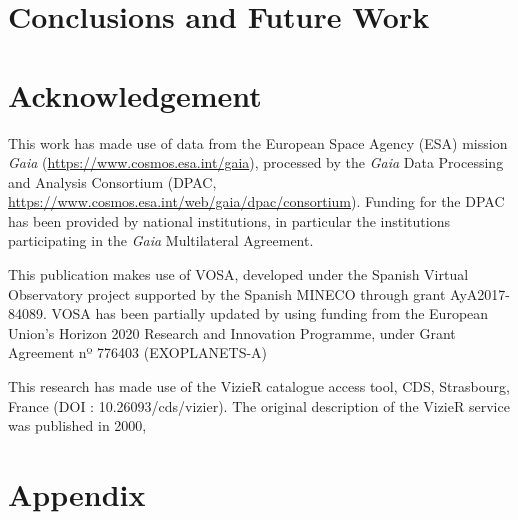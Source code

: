 \documentclass[11pt, a4paper, english]{book}
\begin{document}
\chapter{Conclusions and Future Work}

\chapter*{Acknowledgement}

This work has made use of data from the European Space Agency (ESA) mission
{\it Gaia} (\url{https://www.cosmos.esa.int/gaia}), processed by the {\it Gaia}
Data Processing and Analysis Consortium (DPAC,
\url{https://www.cosmos.esa.int/web/gaia/dpac/consortium}). Funding for the DPAC
has been provided by national institutions, in particular the institutions
participating in the {\it Gaia} Multilateral Agreement.

\medskip

This publication makes use of VOSA, developed under the Spanish Virtual Observatory project
supported by the Spanish MINECO through grant AyA2017-84089.
VOSA has been partially updated by using funding from the European Union's Horizon 2020 Research
and Innovation Programme, under Grant Agreement nº 776403 (EXOPLANETS-A)

\medskip

This research has made use of the VizieR catalogue access tool, CDS, Strasbourg, France (DOI : 10.26093/cds/vizier).
The original description of the VizieR service was published in 2000, \cite[A\&AS 143, 23]{ochsenbein2000vizier}




\appendix
\chapter{Appendix}

\end{document}
